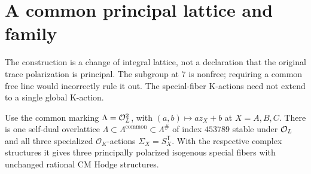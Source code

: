 \section{A common principal lattice and family}
The construction is a change of integral lattice, not a declaration that
the original trace polarization is principal. The subgroup at $7$ is
nonfree; requiring a common free line would incorrectly rule it out.
The special-fiber K-actions need not extend to a single global K-action.

\begin{proposition}\label{prop:commonprincipal}
Use the common marking $\Lambda=\mathcal O_L^2$, with $(a,b)\mapsto az_X+b$ at
$X=A,B,C$. There is one self-dual overlattice
$\Lambda\subset\Lambda^{\mathrm{common}}\subset\Lambda^\#$ of index
$453789$ stable under $\mathcal O_L$ and all three specialized $\mathcal O_K$-actions
$\Sigma_X=S_X^{\mathsf T}$. With the respective complex structures it gives
three principally polarized isogenous special fibers with unchanged rational
CM Hodge structures.
\end{proposition}
